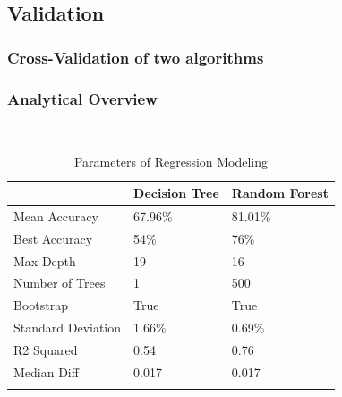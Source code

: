 \documentclass{beamer}
\begin{document}
\subsection{Validation}
\begin{frame}
	\frametitle{Cross-Validation of two algorithms}
    \begin{figure}
        
    \end{figure}
    \end{frame}
\begin{frame}
	\frametitle{Analytical Overview}
    \begin{table}[ht]\
        \caption*{Parameters of Regression Modeling} %
        \centering %
        \begin{tabular}{l l l} %
        \hline\hline %
         &Decision Tree & Random Forest\\ [0.5ex] %
        \hline %
        Mean Accuracy& 67.96\%  & 81.01\%  \\ %
        Best Accuracy & 54\% & 76\%  \\
        Max Depth & 19 & 16  \\
        Number of Trees &  1 & 500  \\
        Bootstrap &  True & True  \\
        Standard Deviation &   1.66\% & 0.69\%  \\
        R2 Squared &  0.54 & 0.76  \\
        Median Diff &  0.017 & 0.017  \\ [1ex] %
        \hline %
        \\
        \end{tabular}
        \end{table}       
        \end{frame}
\end{document}
